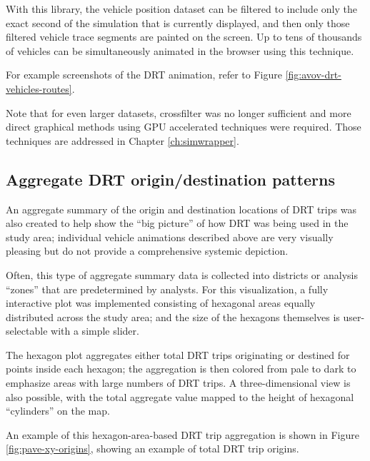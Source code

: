 With this library, the vehicle position dataset can be filtered to include only the exact second of the simulation that is currently displayed, and then only those filtered vehicle trace segments are painted on the screen. Up to tens of thousands of vehicles can be simultaneously animated in the browser using this technique.

For example screenshots of the DRT animation, refer to Figure \ref{fig:avov-drt-vehicles-routes}.

Note that for even larger datasets, crossfilter was no longer sufficient and more direct graphical methods using \gls{GPU} accelerated techniques were required. Those techniques are addressed in Chapter \ref{ch:simwrapper}.

\subsection{Aggregate DRT origin/destination patterns}
\label{pave-od-hexagons}

An aggregate summary of the origin and destination locations of DRT trips was also created to help show the ``big picture'' of how DRT was being used in the study area; individual vehicle animations described above are very visually pleasing but do not provide a comprehensive systemic depiction.

Often, this type of aggregate summary data is collected into districts or analysis ``zones'' that are predetermined by analysts. For this visualization, a fully interactive plot was implemented consisting of hexagonal areas equally distributed across the study area; and the size of the hexagons themselves is user-selectable with a simple slider.

The hexagon plot aggregates either total DRT trips originating or destined for points inside each hexagon; the aggregation is then colored from pale to dark to emphasize areas with large numbers of DRT trips. A three-dimensional view is also possible, with the total aggregate value mapped to the height of hexagonal ``cylinders'' on the map.

An example of this hexagon-area-based DRT trip aggregation is shown in Figure \ref{fig:pave-xy-origins}, showing an example of total DRT trip origins.

